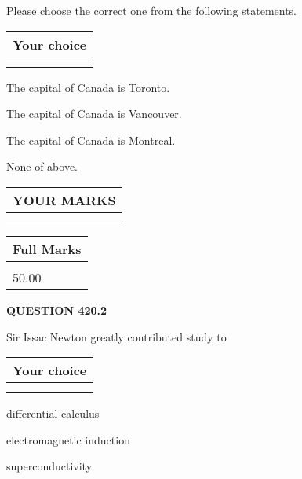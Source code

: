 \documentclass[12pt]{article}
\begin{document}
  
Please choose the correct one from the following statements.
  
  
\noindent\hspace{3.0in} \begin{tabular}{|l|}
\hline
Your choice \\
\hline
 \\ 
 \\ 
\hline
\end{tabular}
  
  
 
 
The capital of Canada is Toronto.
 
 
The capital of Canada is Vancouver.
 
 
The capital of Canada is Montreal.
 
 
 None of above.
 
 
  
\vspace{0.2in}
  
\noindent\begin{tabular}{|l|}
\hline
 YOUR MARKS  \\
\hline
 \\ 
 \\ 
\hline
\end{tabular}
\hspace{0.05in} \begin{tabular}{|l|}
\hline
 Full Marks  \\
\hline
 \\ 
50.00 \\
\hline
\end{tabular}
{\textbf{\Large{QUESTION
420.2 
}}}
  
  
Sir Issac Newton greatly contributed study to
  
  
\noindent\hspace{3.0in} \begin{tabular}{|l|}
\hline
Your choice \\
\hline
 \\ 
 \\ 
\hline
\end{tabular}
  
  
 
 
differential calculus
 
 
electromagnetic induction
 
 
superconductivity
 
\end{document}
